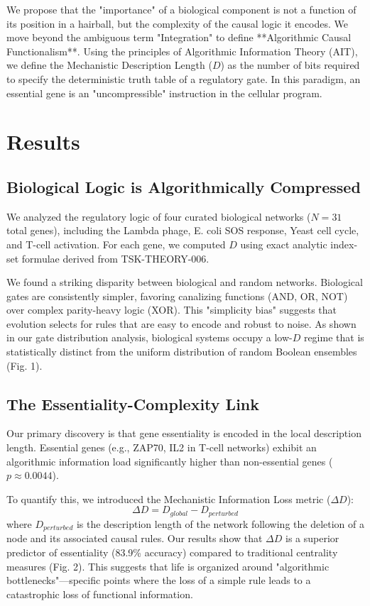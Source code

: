 \documentclass{nature}
\begin{document}
We propose that the "importance" of a biological component is not a function of its position in a hairball, but the complexity of the causal logic it encodes. We move beyond the ambiguous term "Integration" to define **Algorithmic Causal Functionalism**. Using the principles of Algorithmic Information Theory (AIT), we define the Mechanistic Description Length ($D$) as the number of bits required to specify the deterministic truth table of a regulatory gate. In this paradigm, an essential gene is an "uncompressible" instruction in the cellular program.

\section*{Results}

\subsection*{Biological Logic is Algorithmically Compressed}
We analyzed the regulatory logic of four curated biological networks ($N=31$ total genes), including the Lambda phage, E. coli SOS response, Yeast cell cycle, and T-cell activation. For each gene, we computed $D$ using exact analytic index-set formulae derived from TSK-THEORY-006. 

We found a striking disparity between biological and random networks. Biological gates are consistently simpler, favoring canalizing functions (AND, OR, NOT) over complex parity-heavy logic (XOR). This "simplicity bias" suggests that evolution selects for rules that are easy to encode and robust to noise. As shown in our gate distribution analysis, biological systems occupy a low-$D$ regime that is statistically distinct from the uniform distribution of random Boolean ensembles (Fig. 1).



\subsection*{The Essentiality-Complexity Link}
Our primary discovery is that gene essentiality is encoded in the local description length. Essential genes (e.g., ZAP70, IL2 in T-cell networks) exhibit an algorithmic information load significantly higher than non-essential genes ($p \approx 0.0044$). 

To quantify this, we introduced the Mechanistic Information Loss metric ($\Delta D$):
\begin{equation}
\Delta D = D_{global} - D_{perturbed}
\end{equation}
where $D_{perturbed}$ is the description length of the network following the deletion of a node and its associated causal rules. Our results show that $\Delta D$ is a superior predictor of essentiality (83.9\% accuracy) compared to traditional centrality measures (Fig. 2). This suggests that life is organized around "algorithmic bottlenecks"—specific points where the loss of a simple rule leads to a catastrophic loss of functional information.
\end{document}
